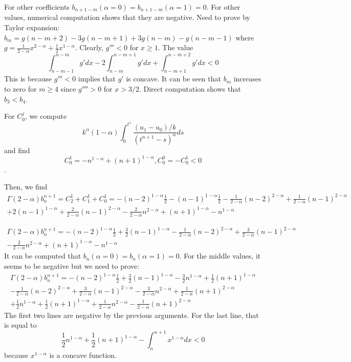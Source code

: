 \documentclass[11pt]{article}
\begin{document}
For other coefficients $b_{n+1-m}(\alpha=0)=b_{n+1-m}(\alpha=1)=0$.  For other values, numerical computation shows that they are negative. Need to prove by Taylor expansion: $b_m=g(n-m+2)-3g(n-m+1)+3g(n-m)-g(n-m-1)$ where $g=\frac{1}{2-\alpha}x^{2-\alpha}+\frac{1}{2}x^{1-\alpha}$. Clearly, $g'''<0$ for $x\ge 1$. The value $$
\int_{n-m-1}^{n-m}g' dx-2\int_{n-m}^{n-m+1}g' dx
+\int_{n-m+1}^{n-m+2}g' dx<0
$$
This is because $g'''<0$ implies that $g'$ is concave. It can be seen that $b_m$ increases to zero for $m\ge 4$ since $g''''>0$ for $x>3/2$. Direct computation shows that $b_3<b_4$.

For $C_0^j$, we compute $$
k^{\alpha}(1-\alpha)\int_0^{t^1}\frac{(u_1-u_0)/k}{(t^{n+1}-s)^{\alpha}}ds
$$
and find $$C_0^1=-n^{1-\alpha}+(n+1)^{1-\alpha}, C_0^0=-C_0^1<0$$.

Then, we find 
\begin{multline*}
\Gamma(2-\alpha)b_n^{n+1}=C_2^1+C_1^1+C_0^1
=-(n-2)^{1-\alpha}\frac{1}{2}-(n-1)^{1-\alpha}\frac{1}{2}
-\frac{1}{2-\alpha}(n-2)^{2-\alpha}+\frac{1}{2-\alpha}(n-1)^{2-\alpha}\\
+2(n-1)^{1-\alpha}+\frac{2}{2-\alpha}(n-1)^{2-\alpha}
-\frac{2}{2-\alpha}n^{2-\alpha}
+(n+1)^{1-\alpha}-n^{1-\alpha}
\end{multline*}

\begin{multline*}
\Gamma(2-\alpha)b_n^{n+1}=-(n-2)^{1-\alpha}\frac{1}{2}+\frac{3}{2}(n-1)^{1-\alpha}
-\frac{1}{2-\alpha}(n-2)^{2-\alpha}+\frac{3}{2-\alpha}(n-1)^{2-\alpha}\\
-\frac{2}{2-\alpha}n^{2-\alpha}+(n+1)^{1-\alpha}-n^{1-\alpha}
\end{multline*}
It can be computed that $b_n(\alpha=0)=b_n(\alpha=1)=0$. For the middle values, it seems to be negative but we need to prove:
\begin{multline*}
\Gamma(2-\alpha)b_n^{n+1}=
-(n-2)^{1-\alpha}\frac{1}{2}+\frac{3}{2}(n-1)^{1-\alpha}
-\frac{3}{2}n^{1-\alpha}+\frac{1}{2}(n+1)^{1-\alpha}\\
-\frac{1}{2-\alpha}(n-2)^{2-\alpha}+\frac{3}{2-\alpha}(n-1)^{2-\alpha}
-\frac{3}{2-\alpha}n^{2-\alpha}+\frac{1}{2-\alpha}(n+1)^{2-\alpha}
\\
+\frac{1}{2}n^{1-\alpha}+\frac{1}{2}(n+1)^{1-\alpha}
+\frac{1}{2-\alpha}n^{2-\alpha}
-\frac{1}{2-\alpha}(n+1)^{2-\alpha}
\end{multline*}
The first two lines are negative by the previous arguments.
For the last line, that is equal to $$
\frac{1}{2}n^{1-\alpha}+\frac{1}{2}(n+1)^{1-\alpha}
-\int_n^{n+1}x^{1-\alpha}dx<0
$$
because $x^{1-\alpha}$ is a concave function.
 
\end{document}
